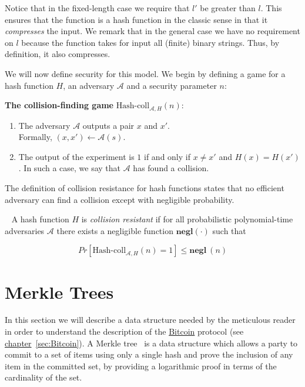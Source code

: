 Notice that in the fixed-length case we require that $l'$ be greater than $l$. This ensures that the
function is a hash function in the classic sense in that it \textit{compresses} the input. We remark
that in the general case we have no requirement on $l$ because the function takes for input all (finite) binary strings. Thus, by definition, it also compresses.

We will now define security for this model. We begin by defining a game for a hash function $H$, an adversary $\mathcal{A}$ and a security parameter $n$:

\vspace{0.2cm}
\noindent \textbf{The collision-finding game} $\mbox{Hash-coll}_{\mathcal{A},H}(n)$: ~\cite{Katz:2007:IMC:1206501}
\begin{enumerate}
  \item The adversary $\mathcal{A}$ outputs a pair $x$ and $x'$. \\
  Formally, $(x,x') \leftarrow \mathcal{A}(s)$.
  \item The output of the experiment is $1$ if and only if $x \neq x'$ and $H(x) = H(x')$. In such a case, we say that $\mathcal{A}$ has found a collision.
\end{enumerate}
%
The definition of collision resistance for hash functions states that no efficient adversary can find a collision except with negligible probability.
%
\begin{definition}~\textnormal{\cite{Katz:2007:IMC:1206501}}
  A hash function $H$ is \emph{collision resistant} if for all probabilistic polynomial-time adversaries $\mathcal{A}$ there exists a negligible function $\textbf{negl}(\cdot)$ such that

\begin{equation} \label{eqn:collision}
  Pr[\mbox{Hash-coll}_{\mathcal{A},H}(n) = 1] \leq \textbf{negl} \: (n)
\end{equation}
\end{definition}

\section{Merkle Trees} \label{sec:merkle-trees}
In this section we will describe a data structure needed by the meticulous reader in order to understand the description of the \hyperref[sec:Bitcoin]{Bitcoin} protocol (see \hyperref[sec:Bitcoin]{chapter}~\ref{sec:Bitcoin}).
A Merkle tree~\cite{merkle} is a data structure which allows a party to commit to a set of items using only a single hash and prove the inclusion of any item in the committed set, by providing a logarithmic proof in terms of the cardinality of the set.

